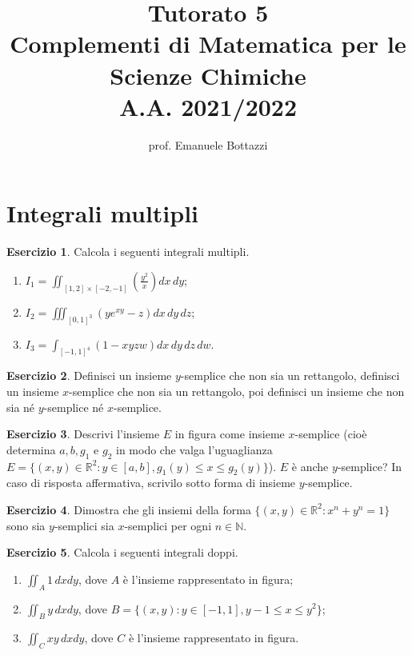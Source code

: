 \documentclass[12pt,a4paper]{article}
\title{Tutorato 5\\Complementi di Matematica per le Scienze Chimiche\\ A.A. 2021/2022}
\author{prof. Emanuele Bottazzi}
\date{}
\theoremstyle{definition}
\newtheorem{exe}{Esercizio}
\begin{document}
\maketitle

\section*{Integrali multipli}

\begin{exe}
    Calcola i seguenti integrali multipli.
    \begin{enumerate}
        \item $I_1 = \iint_{[1,2]\times[-2,-1]} \left(\frac{y^2}{x}\right) dx \, dy$;
        \item $I_2 = \iiint_{[0,1]^3} (y e^{xy} - z) dx \, dy \, dz$;
        \item $I_3 = \int_{[-1,1]^4} (1 - xyzw) dx \, dy \, dz \, dw$.
    \end{enumerate}
\end{exe}

\begin{exe}
    Definisci un insieme $y$-semplice che non sia un rettangolo, definisci un insieme $x$-semplice che non sia un rettangolo, poi definisci un insieme che non sia né $y$-semplice né $x$-semplice.
\end{exe}

\begin{exe}
    Descrivi l'insieme $E$ in figura come insieme $x$-semplice (cioè determina $a,b,g_1$ e $g_2$ in modo che valga l'uguaglianza $E = \{(x,y) \in \mathbb{R}^2 : y \in [a,b], g_1(y) \leq x \leq g_2(y)\}$). $E$ è anche $y$-semplice? In caso di risposta affermativa, scrivilo sotto forma di insieme $y$-semplice.
\end{exe}

\begin{exe}
    Dimostra che gli insiemi della forma $\{(x,y) \in \mathbb{R}^2 : x^n + y^n = 1\}$ sono sia $y$-semplici sia $x$-semplici per ogni $n \in \mathbb{N}$.
\end{exe}

\begin{exe}
    Calcola i seguenti integrali doppi.
    \begin{enumerate}
        \item $\iint_A 1 \, dx dy$, dove $A$ è l'insieme rappresentato in figura;
        \item $\iint_B y \, dx dy$, dove $B = \{(x,y) : y \in [-1,1], y-1 \leq x \leq y^2\}$;
        \item $\iint_C xy \, dx dy$, dove $C$ è l'insieme rappresentato in figura.
    \end{enumerate}
\end{exe}
\end{document}
